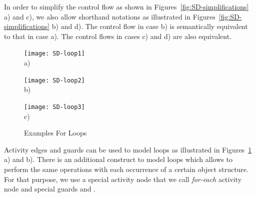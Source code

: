In order to simplify the control flow as shown in Figures~\ref{fig:SD-simplifications} a) and c),
we also allow shorthand notations as illustrated in Figures~\ref{fig:SD-simplifications} b) and d).
The control flow in case b) is semantically equivalent to that in case a).
The control flows in cases c) and d) are also equivalent.

\begin{figure}[htb]
	\centering
  \begin{minipage}[t]{.3\textwidth}
    \centering
    \texttt{[image: SD-loop1]} 
    \\a)
  \end{minipage}%
  \hfill
  \begin{minipage}[t]{.3\textwidth}
    \centering
    \texttt{[image: SD-loop2]}
    \\b)
  \end{minipage}
  \hfill
  \begin{minipage}[t]{.3\textwidth}
    \centering
    \texttt{[image: SD-loop3]}
    \\c)
  \end{minipage}
  \caption{Examples For Loops}
  \label{fig:SD-loops}
\end{figure}

Activity edges and guards can be used to model loops as illustrated in Figures~\ref{fig:SD-loops} a) and b).
There is an additional construct to model loops which allows to perform the same operations with each occurrence of a certain object structure.
For that purpose, we use a special activity node that we call \emph{for-each} activity node
and special guards  and .


